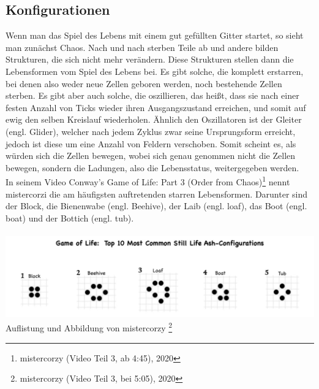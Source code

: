 \documentclass[12pt]{article}
\begin{document}
\subsection{Konfigurationen}
	Wenn man das Spiel des Lebens mit einem gut gefüllten Gitter startet, so sieht man zunächst Chaos. Nach und nach sterben Teile ab und andere bilden Strukturen, die sich nicht mehr verändern. Diese Strukturen stellen dann die Lebensformen vom Spiel des Lebens bei. Es gibt solche, die komplett erstarren, bei denen also weder neue Zellen geboren werden, noch bestehende Zellen sterben. Es gibt aber auch solche, die oszillieren, das heißt, dass sie nach einer festen Anzahl von Ticks wieder ihren Ausgangszustand erreichen, und somit auf ewig den selben Kreislauf wiederholen. Ähnlich den Oszillatoren ist der Gleiter (engl. \glqq Glider\grqq{}), welcher nach jedem Zyklus zwar seine Ursprungsform erreicht, jedoch ist diese um eine Anzahl von Feldern verschoben. Somit scheint es, als würden sich die Zellen bewegen, wobei sich genau genommen nicht die Zellen bewegen, sondern die Ladungen, also die Lebensstatus, weitergegeben werden.\\
	In seinem Video \glqq Conway's Game of Life: Part 3 (Order from Chaos)\grqq{}\footnote{mistercorzy (Video Teil 3, ab 4:45), 2020} nennt mistercorzi die am häufigsten auftretenden starren Lebensformen. Darunter sind der Block, die Bienenwabe (engl. \glqq Beehive\grqq{}), der Laib (engl. \glqq loaf\grqq{}), das Boot (engl. \glqq boat\grqq{}) und der Bottich (engl. \glqq tub\grqq{}).
	\\\\ \includegraphics[width=\textwidth]{commonStillConfigurations} \\ Auflistung und Abbildung von mistercorzy \footnote{mistercorzy (Video Teil 3, bei 5:05), 2020}\\
\end{document}
